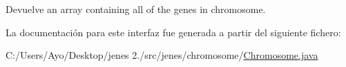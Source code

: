 \begin{DoxyReturn}{Devuelve}
an array containing all of the genes in chromosome. 
\end{DoxyReturn}


La documentación para este interfaz fue generada a partir del siguiente fichero\-:\begin{DoxyCompactItemize}
\item 
C\-:/\-Users/\-Ayo/\-Desktop/jenes 2./src/jenes/chromosome/\hyperlink{_chromosome_8java}{Chromosome.\-java}\end{DoxyCompactItemize}
